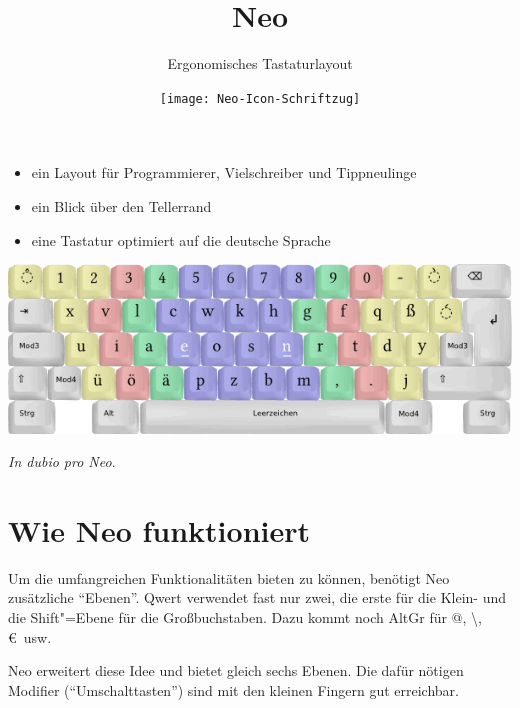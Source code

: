 \documentclass[%
  a4paper
  ,ngerman
  ,notumble,12pt,
]{leaflet}
\title{Neo}
\author{Ergonomisches Tastaturlayout}
\date{\texttt{[image: Neo-Icon-Schriftzug]}}
\begin{document}
\maketitle
\thispagestyle{empty}
\begin{itemize}%
\item ein Layout für Programmierer, Vielschreiber und Tippneulinge
\item ein Blick über den Tellerrand
\item eine Tastatur optimiert auf die deutsche Sprache
\end{itemize}%

\vfill

\includegraphics[width=\textwidth]{tastatur_neo_Ebene1}

\vfill

\begin{center}
\emph{In dubio pro Neo}.
\end{center}
\newpage
\section{Wie Neo funktioniert}
Um die umfangreichen Funktionalitäten bieten zu können, benötigt Neo zusätzliche \enquote{Ebenen}. Qwert verwendet fast nur zwei, die erste für die Klein- und die Shift"=Ebene für die Großbuchstaben. Dazu kommt noch AltGr für @, \textbackslash, \euro\ usw.

Neo erweitert diese Idee und bietet gleich sechs Ebenen. Die dafür nötigen Modifier (\enquote{Umschalttasten}) sind mit den kleinen Fingern gut erreichbar.
\end{document}
